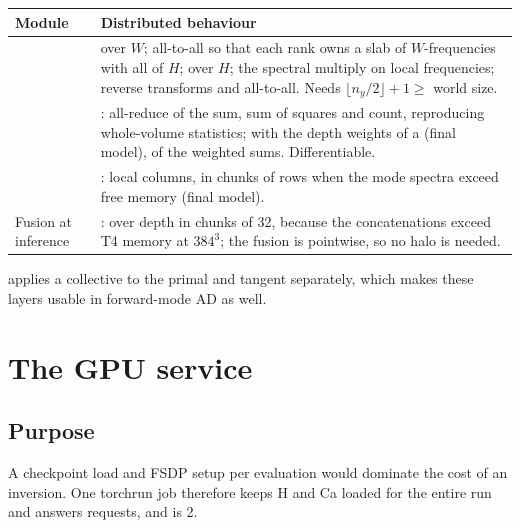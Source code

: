 \begin{table}[H]\centering\small
\begin{tabularx}{\linewidth}{lY}
\toprule
Module&Distributed behaviour\\\midrule
{}& over $W$; all-to-all so that each rank owns a slab of $W$-frequencies with all of $H$;  over $H$; the spectral multiply on local frequencies; reverse transforms and all-to-all. Needs $\lfloor n_y/2\rfloor+1\ge$ world size.\\
&: all-reduce of the sum, sum of squares and count, reproducing whole-volume statistics; with the depth weights of a  (final model), of the weighted sums. Differentiable.\\
&: local columns, in chunks of rows when the mode spectra exceed free memory (final model).\\
Fusion at inference&: over depth in chunks of 32, because the concatenations exceed T4 memory at $384^3$; the fusion is pointwise, so no halo is needed.\\\bottomrule
\end{tabularx}
\end{table}

 applies a collective to the primal and tangent separately, which makes these layers usable in forward-mode AD as well.

\section{The GPU service}

\subsection{Purpose}
A checkpoint load and FSDP setup per evaluation would dominate the cost of an inversion. One torchrun job therefore keeps H and Ca loaded for the entire run and answers requests, and  is 2.

